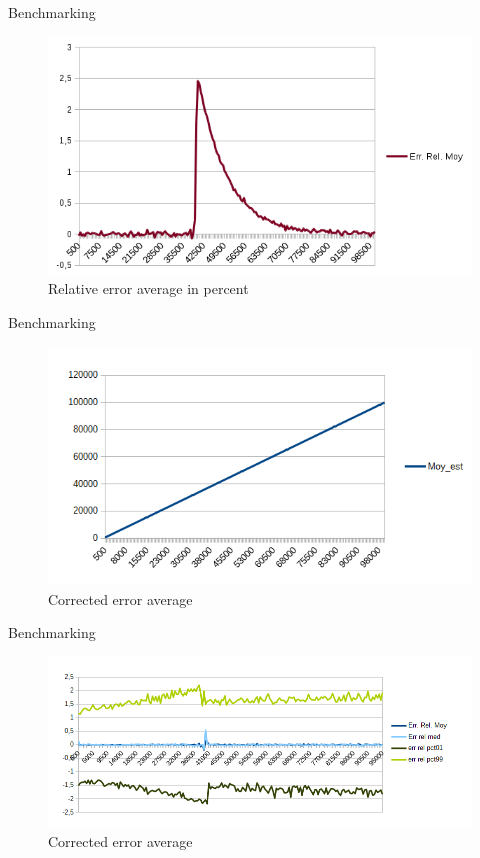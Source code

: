 \documentclass{beamer}
\begin{document}
\begin{frame}{Benchmarking}
\begin{figure}[h!]
   \includegraphics[scale=0.5]{./moy2.png}
   \caption{\label{figerr}Relative error average in percent}
\end{figure}
\end{frame}

\begin{frame}{Benchmarking}
\begin{figure}[h!]
   \includegraphics[scale=0.5]{./moy_corr.png}
   \caption{\label{figerr}Corrected error average}
\end{figure}
\end{frame}


\begin{frame}{Benchmarking}
\begin{figure}[h!]
   \includegraphics[scale=0.5]{./data_corr.png}
   \caption{\label{figerr}Corrected error average}
\end{figure}
\end{frame}
\end{document}
